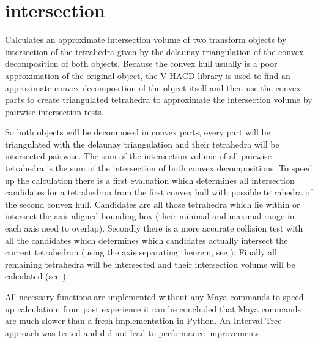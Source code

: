 \documentclass[letterpaper,10pt,english]{sphinxmanual}
\begin{document}
\section{intersection}
\label{pk_src.intersection:intersection}\label{pk_src.intersection::doc}\label{pk_src.intersection:id1}
{\hyperref[index:commands]{}}
\label{pk_src.intersection:module-pk_src.intersection}
Calculates an approximate intersection volume of two transform objects by intersection of the tetrahedra given by the delaunay triangulation of the convex decomposition of both objects. Because the convex hull usually is a poor approximation of the original object, the \href{https://github.com/kmammou/v-hacd}{V-HACD} library is used to find an approximate convex decomposition of the object itself and then use the convex parts to create triangulated tetrahedra to approximate the intersection volume by pairwise intersection tests.

So both objects will be decomposed in convex parts, every part will be triangulated with the delaunay triangulation and their tetrahedra will be intersected pairwise. The sum of the intersection volume of all pairwise tetrahedra is the sum of the intersection of both convex decompositions. To speed up the calculation there is a first evaluation which determines all intersection candidates for a tetrahedron from the first convex hull with possible tetrahedra of the second convex hull. Candidates are all those tetrahedra which lie within or intersect the axis aligned bounding box (their minimal and maximal range in each axis need to overlap). Secondly there is a more accurate collision test with all the candidates which determines which candidates actually intersect the current tetrahedron (using the axis separating theorem, see {\hyperref[pk_src.collision_tet_tet:collision\string-tet\string-tet]{}}). Finally all remaining tetrahedra will be intersected and their intersection volume will be calculated (see {\hyperref[pk_src.intersection_tet_tet:intersection\string-tet\string-tet]{}}).

All necessary functions are implemented without any Maya commands to speed up calculation; from past experience it can be concluded that Maya commands are much slower than a fresh implementation in Python.
An Interval Tree approach was tested and did not lead to performance improvements.
\end{document}
